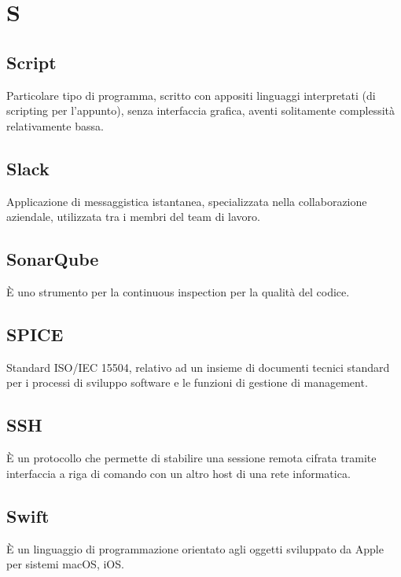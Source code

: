 \section*{S}

\subsection{Script}
Particolare tipo di programma, scritto con appositi linguaggi interpretati (di scripting per l'appunto), senza interfaccia grafica, aventi solitamente complessità relativamente bassa.

\subsection{Slack}
Applicazione di messaggistica istantanea, specializzata nella collaborazione aziendale, utilizzata tra i membri del team di lavoro.

\subsection{SonarQube} 
È uno strumento per la continuous inspection per la qualità del codice.

\subsection{SPICE}
Standard ISO/IEC 15504, relativo ad un insieme di documenti tecnici standard per i processi di sviluppo software e le funzioni di gestione di management.

\subsection{SSH}
È un protocollo che permette di stabilire una sessione remota cifrata tramite interfaccia a riga di comando con un altro host di una rete informatica.

\subsection{Swift}
È un linguaggio di programmazione orientato agli oggetti sviluppato da Apple per sistemi macOS, iOS.
